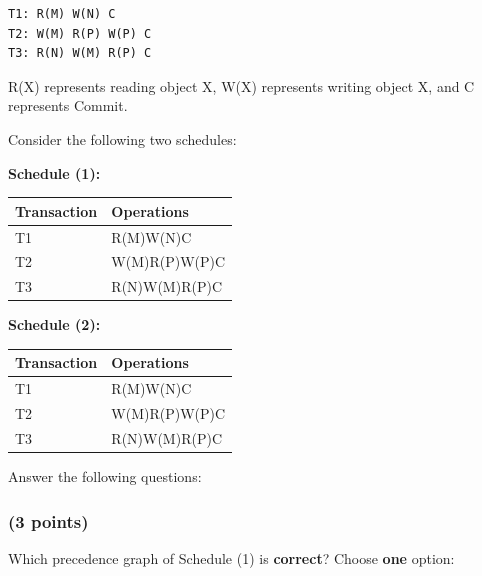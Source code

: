 \documentclass[11pt,a4paper]{article}
\begin{document}
\begin{verbatim}
T1: R(M) W(N) C
T2: W(M) R(P) W(P) C
T3: R(N) W(M) R(P) C
\end{verbatim}

R(X) represents reading object X, W(X) represents writing object X, and C represents Commit.

Consider the following two schedules:

\textbf{Schedule (1):}

\begin{center}
\begin{tabular}{|l|l|}
\hline
\textbf{Transaction} & \textbf{Operations} \\
\hline
T1 & \phantom{xxxxxxx}R(M)\phantom{xxxx}W(N)\phantom{xxxxxxxxxxxxxxxxxx}C \\
\hline
T2 & W(M)\phantom{xxxxxxxxxxxxxxxx}R(P)\phantom{x}W(P)\phantom{xxxxxxxxxxx}C \\
\hline
T3 & \phantom{xxxxxxxxxxxxxxxx}R(N)\phantom{xxxxxxxxx}W(M)\phantom{x}R(P)\phantom{xxxxxxxxx}C \\
\hline
\end{tabular}
\end{center}

\vspace{0.5em}

\textbf{Schedule (2):}

\begin{center}
\begin{tabular}{|l|l|}
\hline
\textbf{Transaction} & \textbf{Operations} \\
\hline
T1 & R(M)\phantom{xxxx}W(N)\phantom{xxxxxxxxxxxxxx}C \\
\hline
T2 & \phantom{xxxx}W(M)\phantom{xxxxxxxxx}R(P)\phantom{x}W(P)\phantom{xxxx}C \\
\hline
T3 & \phantom{xxxxxxxxxxxxxx}R(N)\phantom{xxxx}W(M)\phantom{xxxxxxxxx}R(P)\phantom{x}C \\
\hline
\end{tabular}
\end{center}

Answer the following questions:

\subsubsection{(3 points)}
Which precedence graph of Schedule (1) is \textbf{correct}? Choose \textbf{one} option:

\begin{center}
\end{center}
\end{document}
